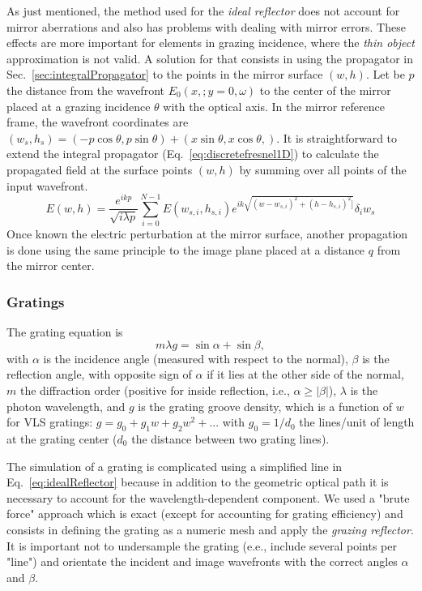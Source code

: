 \documentclass[]{spie}  %
\begin{document}
As just mentioned, the method used for the {\it ideal reflector} does not account for mirror aberrations and also has problems with dealing with mirror errors. These effects are more important for elements in grazing incidence, where the {\it thin object} approximation is not valid. A solution for that consists in using the propagator in Sec.~\ref{sec:integralPropagator} to the points in the mirror surface $(w,h)$. Let be $p$ the distance from the wavefront $E_0(x,;y=0,\omega)$ to the center of the mirror placed at a grazing incidence $\theta$ with the optical axis. In the mirror reference frame, the wavefront coordinates are $(w_s, h_s) =(-p \cos \theta, p \sin \theta) + (x \sin \theta, x \cos \theta,)$. It is straightforward to extend the integral propagator (Eq.~\ref{eq:discretefresnel1D}) to calculate the propagated field at the surface points $(w,h)$ by summing over all points of the input wavefront. 
\begin{equation}\label{eq:grazingPropagator}
 E(w,h) = \frac {e^{i k p }}{ \sqrt{i \lambda p}} \sum_{i=0}^{N-1}  E(w_{s,i},h_{s,i}) e^{i k \sqrt{(w - w_{s,i})^2 + (h - h_{s,i})^2]}} \delta_i w_s
\end{equation}
Once known the electric perturbation at the mirror surface, another propagation is done using the same principle to the image plane placed at a distance $q$ from the  mirror center. 

\subsubsection{Gratings}
\label{sec:grating}


The grating equation is
\begin{equation}
    m \lambda g = \sin\alpha + \sin\beta,
\end{equation}
with $\alpha$ is the incidence angle (measured with respect to the normal), $\beta$ is the reflection angle, with opposite sign of $\alpha$ if it lies at the other side of the normal, $m$ the diffraction order (positive for inside reflection, i.e., $\alpha \ge |\beta|$),
$\lambda$ is the photon wavelength, and $g$ is the grating groove density, which is a function of $w$ for VLS gratings: $g = g_0 + g_1 w + g_2 w^2 + ...$ with $g_0 = 1/d_0$ the lines/unit of length at the grating center ($d_0$ the distance between two grating lines).

The simulation of a grating is complicated using a simplified line in Eq.~\ref{eq:idealReflector} because in addition to the geometric optical path it is necessary to account for the wavelength-dependent component. We used a "brute force" approach which is exact (except for accounting for grating efficiency) and consists in defining the grating as a numeric mesh and apply the {\it grazing reflector}. It is important not to undersample the grating (e.e., include several points per "line") and orientate the incident and image wavefronts with the correct angles $\alpha$ and $\beta$.      
\end{document}
